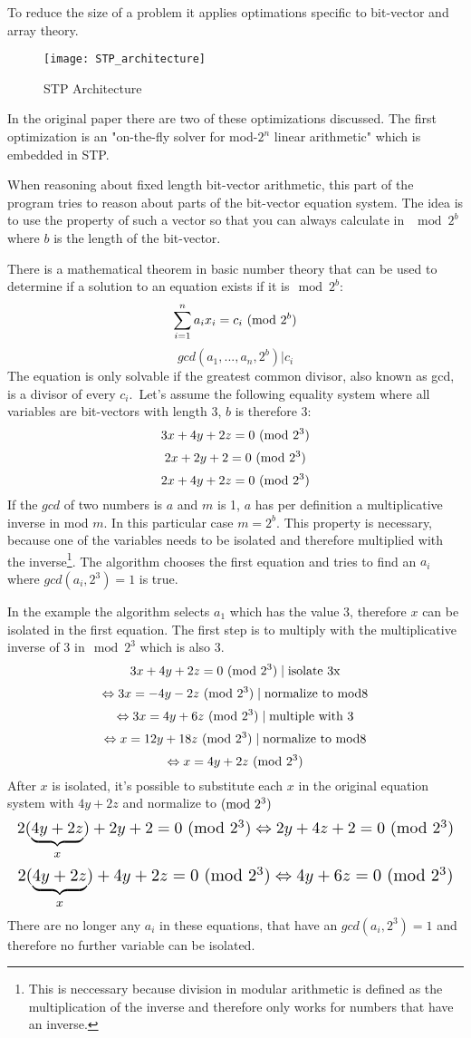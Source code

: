 
To reduce the size of a problem it applies optimations specific to bit-vector and array theory.
\begin{figure}
\texttt{[image: STP\_architecture]}
\centering
\caption{STP Architecture}
\label{fig:STP_architecture}
\end{figure}
In the original paper \cite{Ganesh:2007:DPB:1770351.1770421} there are two of these optimizations discussed. The first optimization is an "on-the-fly solver for mod-$2^n$ linear arithmetic" which is embedded in STP. 

When reasoning about fixed length bit-vector arithmetic, this part of the program tries to reason about parts of the bit-vector equation system.
The idea is to use the property of such a vector so that you can always calculate in $\mod{2^b}$ where $b$ is the length of the bit-vector.

There is a mathematical theorem in basic number theory that can be used to determine if a solution to an equation exists if it is$\mod{2^b}$:
$$\sum_{i=1}^{n} a_ix_i = c_i  \ (\mathrm{mod}\ 2^b)$$
$$gcd(a_1,...,a_n,2^b) | c_i$$
The equation is only solvable if the greatest common divisor, also known as gcd, is a divisor of every $c_i$.\
Let's assume the following equality system where all variables are bit-vectors with length 3, $b$ is therefore 3:
\todo{replace system with own example}
$$3x+4y+2z=0 \ (\mathrm{mod}\ 2^3)$$
$$2x+2y+2=0  \ (\mathrm{mod}\ 2^3)$$
$$2x+4y+2z=0 \ (\mathrm{mod}\ 2^3)$$
If the $gcd$ of two numbers is $a$ and $m$ is 1, $a$ has per definition a multiplicative inverse in mod $m$. In this particular case $m=2^b$. This property is necessary, because one of the variables needs to be isolated and therefore multiplied with the inverse\footnote{This is neccessary because division in modular arithmetic is defined as the multiplication of the inverse and therefore only works for numbers that have an inverse.}.
The algorithm chooses the first equation and tries to find an $a_i$ where $gcd(a_i,2^3) = 1$ is true.

In the example the algorithm selects $a_1$ which has the value $3$, therefore $x$ can be isolated in the first equation.
The first step is to multiply with the multiplicative inverse of 3 in$\mod{2^3}$ which is also 3.
$$3x+4y+2z = 0 \ (\mathrm{mod}\ 2^3) \mid \text{isolate 3x}$$
$$\Leftrightarrow 3x=-4y-2z  \ (\mathrm{mod}\ 2^3)  \mid \text{normalize to mod8}$$
$$\Leftrightarrow 3x=4y+6z  \ (\mathrm{mod}\ 2^3)  \mid \text{multiple with 3}$$
$$\Leftrightarrow x=12y+18z \ (\mathrm{mod}\ 2^3)  \mid \text{normalize to mod8}$$
$$\Leftrightarrow x=4y+2z \ (\mathrm{mod}\ 2^3)$$
After $x$ is isolated, it's possible to substitute each $x$ in the original equation system with $4y+2z$ and normalize to$\ (\mathrm{mod}\ 2^3)$
\[\resizebox{\columnwidth}{!}{$\displaystyle
$$2(\underbrace{4y+2z}_{x})+2y+2=0 \Mod{2^3} \Leftrightarrow 2y + 4z + 2 = 0\Mod{2^3} $$
$}\]
\[\resizebox{\columnwidth}{!}{$\displaystyle
$$2(\underbrace{4y+2z}_{x})+ 4y + 2z = 0 \Mod{2^3} \Leftrightarrow 4y + 6z = 0\Mod{2^3} $$
$}\]
There are no longer any ${a_i}$ in these equations, that have an $gcd(a_i,2^3) = 1$ and therefore no further variable can be isolated.

